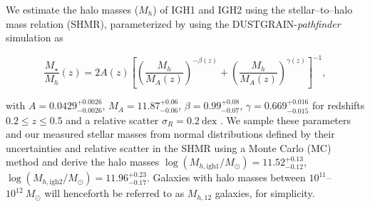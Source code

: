 \documentclass[twocolumn, linenumbers, tra]{aastex631}
\begin{document}
We estimate the halo masses ($M_h$) of IGH1 and IGH2 using the \citet{Moster2010} stellar--to--halo mass relation (SHMR), parameterized by \citet{Girelli2020} using the DUSTGRAIN-\textit{pathfinder} simulation as

\begin{equation}\label{eq:shmr}
\frac{M_\star}{M_h}(z) = 2 A(z)\left[\left(\frac{M_h}{M_A(z)}\right)^{-\beta(z)}+\left(\frac{M_h}{M_A(z)}\right)^{\gamma(z)}\right]^{-1},
\end{equation}

\noindent
with $A = 0.0429_{-0.0026}^{+0.0026}$, $M_A = 11.87_{-0.06}^{+0.06}$, $\beta = 0.99_{-0.07}^{+0.08}$, $\gamma = 0.669_{-0.015}^{+0.016}$ for redshifts $0.2 \leq z \leq 0.5$ and a relative scatter $\sigma_R = 0.2\ \mathrm{dex}$ \citep[see Table 2 in][]{Girelli2020}. We sample these parameters and our measured stellar masses from normal distributions defined by their uncertainties and relative scatter in the SHMR using a Monte Carlo (MC) method and derive the halo masses $\log \left(M_{h, \mathrm{igh1}}/M_\odot\right) = 11.52^{+0.13}_{-0.12}$, $\log \left(M_{h, \mathrm{igh2}}/M_\odot\right) = 11.96^{+0.23}_{-0.17}$. Galaxies with halo masses between $10^{11}$--$10^{12}\ M_\odot$ will henceforth be referred to as $M_{h,12}$ galaxies, for simplicity.
\end{document}
